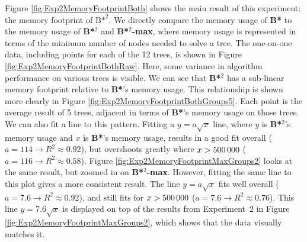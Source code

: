 Figure \ref{fig:Exp2MemoryFootprintBoth} shows the main result of this experiment: the memory footprint of ${\text{B*}}^2$. We directly compare the memory usage of \textbf{B*} to the memory usage of \textbf{B*}$^2$ and \textbf{B*}$^2$\textbf{-max}, where memory usage is represented in terms of the minimum number of nodes needed to solve a tree. The one-on-one data, including points for each of the 12 trees, is shown in Figure \ref{fig:Exp2MemoryFootprintBothRaw}. Here, some variance in algorithm performance on various trees is visible. We can see that \textbf{B*}$^2$ has a sub-linear memory footprint relative to \textbf{B*}'s memory usage. This relationship is shown more clearly in Figure \ref{fig:Exp2MemoryFootprintBothGroups5}. Each point is the average result of 5 trees, adjacent in terms of \textbf{B*}'s memory usage on those trees. We can also fit a line to this pattern. Fitting a $y=a\sqrt{x}$ line, where $y$ is \textbf{B*}$^2$'s memory usage and $x$ is \textbf{B*}'s memory usage, results in a good fit overall ($a=114\to R^2\approx0.92$), but overshoots greatly where $x > \text{500\,000}$ ($a=116\to R^2\approx0.58$). Figure \ref{fig:Exp2MemoryFootprintMaxGroups2} looks at the same result, but zoomed in on \textbf{B*}$^2$\textbf{-max}. However, fitting the same line to this plot gives a more consistent result. The line $y=a\sqrt{x}$ fits well overall ($a=7.6\to R^2\approx 0.92$), and still fits for $x > 500\text{\,}000$ ($a=7.6\to R^2\approx 0.76$). This line $y=7.6\sqrt{x}$ is displayed on top of the results from Experiment\ 2 in Figure \ref{fig:Exp2MemoryFootprintMaxGroups2}, which shows that the data visually matches it.
%
